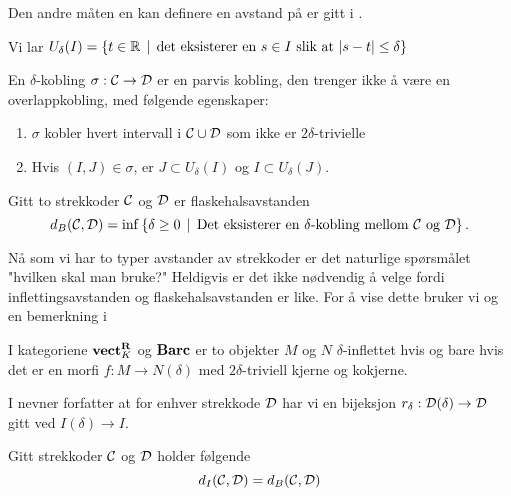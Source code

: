 Den andre måten en kan definere en avstand på er gitt
i \cite[seksjon 4.2]{Bauer2020}.

Vi lar $U_\delta(I) = \left\{t\in\mathbb{R}\,\mid\,\text{det eksisterer en
$s\in I$ slik at }|s-t|\leq\delta\right\}$

\begin{definisjon}\label{def:delta-kobling}
En $\delta$-kobling $\sigma:\mathcal{C}\to \mathcal{D}$ er en parvis
  kobling, den trenger ikke å være en overlappkobling, med
  følgende egenskaper:
\begin{enumerate}
    \item $\sigma$ kobler hvert intervall
      i $\mathcal{C}\cup\mathcal{D}$ som ikke er $2\delta$-trivielle\\
    \item Hvis $(I,J)\in\sigma$, er $J\subset U_\delta(I)$
      og $I\subset U_\delta(J)$.
\end{enumerate}
\end{definisjon}

\begin{definisjon}\label{def:FlaskAvst}
Gitt to strekkoder $\mathcal{C}$ og $\mathcal{D}$ er flaskehalsavstanden
\[d_B(\mathcal{C},\mathcal{D}) = \inf\left\{\delta\geq 0\,\mid\,\text{Det
  eksisterer en $\delta$-kobling mellom $\mathcal{C}$ og
  $\mathcal{D}$}\right\}.\]
\end{definisjon}

Nå som vi har to typer avstander av strekkoder er det
naturlige spørsmålet "hvilken skal man bruke?" Heldigvis
er det ikke nødvendig å velge fordi inflettingsavstanden
og flaskehalsavstanden er like. For å vise dette bruker vi
\citep[proposisjon 4.2]{Bauer2020} og en bemerkning
i \citep[seksjon 4.2]{Bauer2020}

\begin{proposisjon}\label{prop:Prop2.4-Bauer2020}
  I kategoriene $\textnormal{\textbf{vect}}_K^{\textnormal{\textbf{{R}}}}$ og $\textnormal{\textbf{Barc}}$ er to objekter $M$ og $N$
  $\delta$-inflettet hvis og bare hvis det er en morfi $f: M\to
  N(\delta)$ med $2\delta$-triviell kjerne og kokjerne.
\end{proposisjon}

\begin{bemerk}\label{bem:r_delta}
  I \citep[seksjon 4.2]{Bauer2020} nevner forfatter at for
  enhver strekkode $\mathcal{D}$ har vi en bijeksjon 
  $r_\delta:\mathcal{D}(\delta)\to\mathcal{D}$ gitt ved $I(\delta)\to
  I$.
\end{bemerk}

\begin{teorem}\label{trm:FA_lik_IA}
Gitt strekkoder $\mathcal{C}$ og $\mathcal{D}$ holder følgende
\[d_I(\mathcal{C},\mathcal{D}) = d_B(\mathcal{C},\mathcal{D})\]
\end{teorem}
